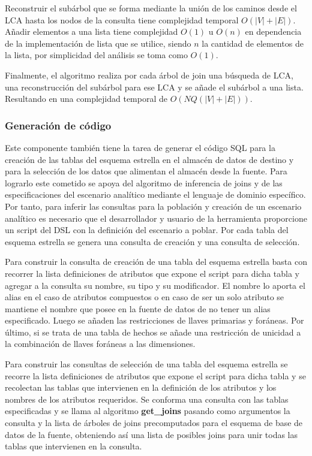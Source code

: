 Reconstruir el sub\'arbol que se forma mediante la uni\'on de los caminos desde el LCA hasta los nodos 
de la consulta tiene complejidad temporal $O(|V| + |E|)$. Añadir elementos a una lista tiene complejidad 
$O(1)$ u $O(n)$ en dependencia de la implementación de lista que se utilice, siendo $n$ la cantidad 
de elementos de la lista, por simplicidad del análisis se toma como $O(1)$.

Finalmente, el algoritmo realiza por cada \'arbol de join una búsqueda de LCA, una reconstrucción 
del sub\'arbol para ese LCA y se añade el sub\'arbol a una lista. Resultando en una complejidad 
temporal de $O(NQ(|V| + |E|))$.


\subsubsection{Generaci\'on de c\'odigo}

Este componente también tiene la tarea de generar el código SQL para la creación de las 
tablas del esquema estrella en el almacén de datos de destino y para la selección de 
los datos que alimentan el almacén desde la fuente. Para lograrlo este cometido se apoya 
del algoritmo de inferencia de joins y de las especificaciones del escenario analítico 
mediante el lenguaje de dominio específico. Por tanto, para inferir las consultas para 
la población y creación de un escenario analítico es necesario que el desarrollador y 
usuario de la herramienta proporcione un script del DSL con la definición del escenario 
a poblar. Por cada tabla del esquema estrella se genera una consulta de creación y una 
consulta de selección.

Para construir la consulta de creación de una tabla del esquema estrella basta con recorrer 
la lista definiciones de atributos que expone el script para dicha tabla y agregar a la consulta 
su nombre, su tipo y su modificador. 
El nombre lo aporta el alias en el caso de atributos compuestos o en caso de ser un solo atributo 
se mantiene el nombre que posee en la fuente de datos de no tener un alias especificado. Luego se 
añaden las restricciones de llaves primarias y for\'aneas. Por \'ultimo, si se trata de una tabla 
de hechos se añade una restricción de unicidad a la combinación de llaves for\'aneas a las 
dimensiones.

Para construir las consultas de selección de una tabla del esquema estrella se recorre la 
lista definiciones de atributos que expone el script para dicha tabla y se recolectan las 
tablas que intervienen en la definición de los atributos y los nombres de los atributos requeridos.
Se conforma una consulta con las tablas especificadas y se llama al algoritmo \textbf{get\_joins} 
pasando como argumentos la consulta y la lista de \'arboles de joins precomputados para el esquema 
de base de datos de la fuente, obteniendo as\'i una lista de posibles joins para unir todas las 
tablas que intervienen en la consulta.

